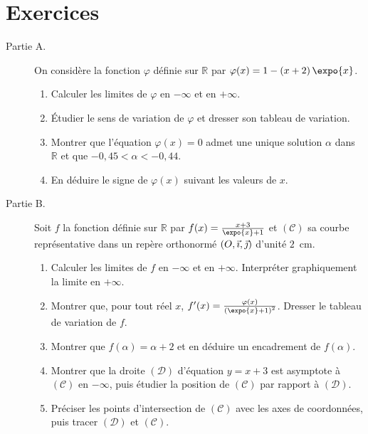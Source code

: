 \section{Exercices}
\begin{exo}
\label{exo:el quotient expo}
\begin{description}
\item[Partie A.] On consid\`ere la fonction $\varphi$ d\'efinie sur $\mathbb{R}$ par $\varphi(x) = 1 - (x+2)\,\expo{x}$.
      \begin{enumerate}
      \item Calculer les limites de $\varphi$ en $-\infty$ et en $+\infty$.
      \item \'Etudier le sens de variation de $\varphi$ et dresser son tableau de variation.
      \item Montrer que l'\'equation $\varphi(x) = 0$ admet une unique solution $\alpha$ dans $\mathbb{R}$ et que
            $-0{,}45 < \alpha < -0{,}44$.
      \item En d\'eduire le signe de $\varphi(x)$ suivant les valeurs de $x$.
      \end{enumerate}
\item[Partie B.] Soit $f$ la fonction d\'efinie sur $\mathbb{R}$ par $f(x) = \frac{x+3}{\expo{x} + 1}$ et
      $(\mathcal{C})$ sa courbe repr\'esentative dans un rep\`ere orthonorm\'e $(O , \vec{\imath} , \vec{\jmath} )$ d'unit\'e $2$~cm.
      \begin{enumerate}
      \item Calculer les limites de $f$ en $-\infty$ et en $+\infty$. Interpr\'eter graphiquement la limite en $+\infty$.
      \item Montrer que, pour tout r\'eel $x$, $f'(x) = \frac{\varphi(x)}{\left(\expo{x}+1\right)^2}$.
            Dresser le tableau de variation de $f$.
      \item Montrer que $f(\alpha) = \alpha + 2$ et en d\'eduire un encadrement de $f(\alpha)$.
      \item Montrer que la droite $(\mathcal{D})$ d'\'equation $y = x + 3$ est asymptote \`a $(\mathcal{C})$ en $-\infty$,
            puis \'etudier la position de $(\mathcal{C})$ par rapport \`a $(\mathcal{D})$.
      \item Pr\'eciser les points d'intersection de $(\mathcal{C})$ avec les axes de coordonn\'ees,
            puis tracer $(\mathcal{D})$ et $(\mathcal{C})$.
      \end{enumerate}
\end{description}
\end{exo}
